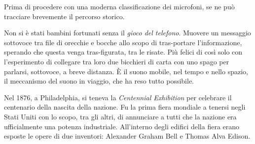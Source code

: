 \begin{refsection}
Prima di procedere con una moderna classificazione dei microfoni, se ne può tracciare
brevemente il percorso storico.

Non si è stati bambini fortunati senza il \emph{gioco del telefono}. Muovere
un messaggio sottovoce tra file di orecchie e bocche allo scopo di tras-portare
l'informazione, sperando che questa venga tras-figurata, tra le risate. Più
felici di così solo con l'esperimento di collegare tra loro due bicchieri di carta con
uno spago per parlarsi, sottovoce, a breve distanza. È il suono mobile, nel tempo
e nello spazio, il meccanismo del suono in viaggio, che ha reso tutto possibile.

Nel 1876, a Philadelphia, si teneva la \emph{Centennial Exhibition} per celebrare
il centenario della nascita della nazione. Fu la prima fiera mondiale a tenersi
negli Stati Uniti con lo scopo, tra gli altri, di annunciare a tutti che la nazione era
ufficialmente una potenza industriale. All'interno degli edifici della fiera erano
esposte le opere di due inventori: Alexander Graham Bell e Thomas Alva Edison.


\end{refsection}
